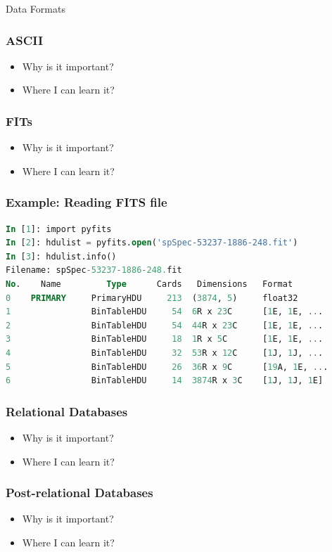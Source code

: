 \documentclass[fleqn]{beamer}
\begin{document}
\begin{section}{Data Formats}
  \begin{frame}\frametitle{ASCII}
  \begin{itemize}
    \item{Why is it important?}
    \item{Where I can learn it?}
  \end{itemize}
  \end{frame}

  \begin{frame}\frametitle{FITs}
  \begin{itemize}
    \item{Why is it important?}
    \item{Where I can learn it?}
  \end{itemize}
  \end{frame}

\begin{frame}[containsverbatim]\frametitle{Example: Reading FITS file}
\begin{lstlisting}[language=SQL]
In [1]: import pyfits
In [2]: hdulist = pyfits.open('spSpec-53237-1886-248.fit')
In [3]: hdulist.info()
Filename: spSpec-53237-1886-248.fit
No.    Name         Type      Cards   Dimensions   Format
0    PRIMARY     PrimaryHDU     213  (3874, 5)     float32
1                BinTableHDU     54  6R x 23C      [1E, 1E, ...
2                BinTableHDU     54  44R x 23C     [1E, 1E, ...
3                BinTableHDU     18  1R x 5C       [1E, 1E, ...
4                BinTableHDU     32  53R x 12C     [1J, 1J, ...
5                BinTableHDU     26  36R x 9C      [19A, 1E, ...
6                BinTableHDU     14  3874R x 3C    [1J, 1J, 1E]
\end{lstlisting}
\end{frame}


  \begin{frame}\frametitle{Relational Databases}
  \begin{itemize}
    \item{Why is it important?}
    \item{Where I can learn it?}
  \end{itemize}
  \end{frame}

  \begin{frame}\frametitle{Post-relational Databases}
  \begin{itemize}
    \item{Why is it important?}
    \item{Where I can learn it?}
  \end{itemize}

  \end{frame}
\end{section}
\end{document}
